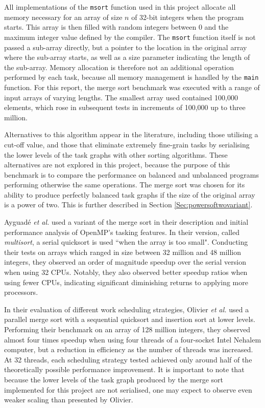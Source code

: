 \documentclass{report}
\begin{document}
All implementations of the \verb!msort! function used in this project allocate all memory necessary for an array of size \(n\) of 32-bit integers when the program starts. This array is then filled with random integers between 0 and the maximum integer value defined by the compiler. The \verb!msort! function itself is not passed a sub-array directly, but a pointer to the location in the original array where the sub-array starts, as well as a size parameter indicating the length of the sub-array. Memory allocation is therefore not an additional operation performed by each task, because all memory management is handled by the \verb!main! function. For this report, the merge sort benchmark was executed with a range of input arrays of varying lengths. The smallest array used contained 100,000 elements, which rose in subsequent tests in increments of 100,000 up to three million.

Alternatives to this algorithm appear in the literature, including those utilising a cut-off value, and those that eliminate extremely fine-grain tasks by serialising the lower levels of the task graphs with other sorting algorithms. These alternatives are not explored in this project, because the purpose of this benchmark is to compare the performance on balanced and unbalanced programs performing otherwise the same operations. The merge sort was chosen for its ability to produce perfectly balanced task graphs if the size of the original array is a power of two. This is further described in Section \ref{Sec:powersoftwovariant}.

Ayguad\'{e} \textit{et al.}\cite{Ayguade09} used a variant of the merge sort in their description and initial performance analysis of OpenMP's tasking features. In their version, called \textit{multisort}, a serial quicksort is used ``when the array is too small". Conducting their tests on arrays which ranged in size between 32 million and 48 million integers, they observed an order of magnitude speedup over the serial version when using 32 CPUs. Notably, they also observed better speedup ratios when using fewer CPUs, indicating significant diminishing returns to applying more processors.

In their evaluation of different work scheduling strategies, Olivier \textit{et al.}\cite{Olivier12} used a parallel merge sort with a sequential quicksort and insertion sort at lower levels. Performing their benchmark on an array of 128 million integers, they observed almost four times speedup when using four threads of a four-socket Intel Nehalem computer, but a reduction in efficiency as the number of threads was increased. At 32 threads, each scheduling strategy tested achieved only around half of the theoretically possible performance improvement. It is important to note that because the lower levels of the task graph produced by the merge sort implemented for this project are not serialised, one may expect to observe even weaker scaling than presented by Olivier.
\end{document}
